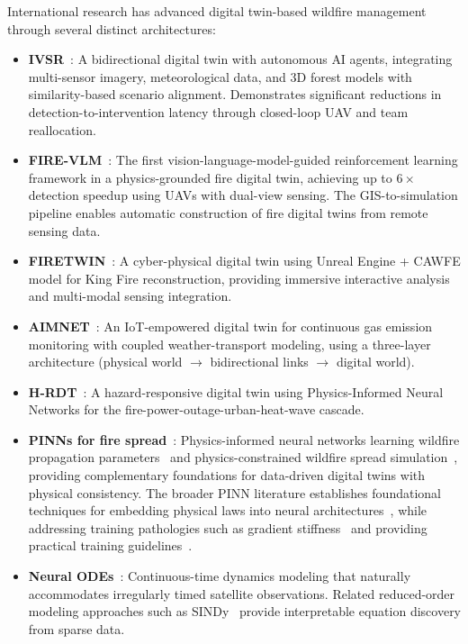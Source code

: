 \documentclass[5p,twocolumn]{elsarticle}
\newcommand{\abbrev}[1]{{\small\textsc{#1}}}
\begin{document}
International research has advanced digital twin-based wildfire management through several distinct architectures:

\begin{itemize}
  \item \textbf{\abbrev{IVSR}}~\cite{morsali2026}: A bidirectional digital twin with autonomous \abbrev{AI} agents, integrating multi-sensor imagery, meteorological data, and 3D forest models with similarity-based scenario alignment. Demonstrates significant reductions in detection-to-intervention latency through closed-loop \abbrev{UAV} and team reallocation.
  \item \textbf{\abbrev{FIRE-VLM}}~\cite{webb2026}: The first vision-language-model-guided reinforcement learning framework in a physics-grounded fire digital twin, achieving up to $6\times$ detection speedup using \abbrev{UAV}s with dual-view sensing. The \abbrev{GIS}-to-simulation pipeline enables automatic construction of fire digital twins from remote sensing data.
  \item \textbf{\abbrev{FIRETWIN}}~\cite{raha2025}: A cyber-physical digital twin using Unreal Engine + \abbrev{CAWFE} model for King Fire reconstruction, providing immersive interactive analysis and multi-modal sensing integration.
  \item \textbf{\abbrev{AIMNET}}~\cite{zhou2025}: An IoT-empowered digital twin for continuous gas emission monitoring with coupled weather-transport modeling, using a three-layer architecture (physical world $\to$ bidirectional links $\to$ digital world).
  \item \textbf{\abbrev{H-RDT}}~\cite{shen2025}: A hazard-responsive digital twin using Physics-Informed Neural Networks for the fire-power-outage-urban-heat-wave cascade.
  \item \textbf{\abbrev{PINN}s for fire spread}~\cite{vogiatzoglou2024,mao2024_pinn}: Physics-informed neural networks learning wildfire propagation parameters~\cite{vogiatzoglou2024} and physics-constrained wildfire spread simulation~\cite{mao2024_pinn}, providing complementary foundations for data-driven digital twins with physical consistency. The broader PINN literature establishes foundational techniques for embedding physical laws into neural architectures~\cite{karniadakis2021,cuomo2022,lu2021_deepxde,markidis2021}, while addressing training pathologies such as gradient stiffness~\cite{wang2021_gradient,krishnapriyan2021} and providing practical training guidelines~\cite{wang2023_expert}.\\
  \item \textbf{Neural ODEs}~\cite{chen2018}: Continuous-time dynamics modeling that naturally accommodates irregularly timed satellite observations. Related reduced-order modeling approaches such as SINDy~\cite{brunton2016_sindy} provide interpretable equation discovery from sparse data.\\

\end{itemize}
\end{document}
